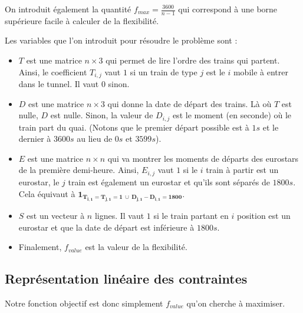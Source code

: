 \documentclass{rapport}
\begin{document}
On introduit également la quantité $f_{max} = \frac{3600}{n - 1}$ qui correspond à une borne supérieure facile à calculer de la flexibilité.

Les variables que l'on introduit pour résoudre le problème sont :
\begin{itemize}
	\item $T$ est une matrice $n \times 3$ qui permet de lire l'ordre des trains qui partent. Ainsi, le coefficient $T_{i,j}$ vaut $1$ si un train de type $j$ est le $i$ mobile à entrer dans le tunnel. Il vaut 0 sinon.
	\item $D$ est une matrice $n \times 3$ qui donne la date de départ des trains. Là où $T$ est nulle, $D$ est nulle. Sinon, la valeur de $D_{i, j}$ est le moment (en seconde) où le train part du quai. (Notons que le premier départ possible est à $1s$ et le dernier à $3600s$ au lieu de $0s$ et $3599s$).
	\item $E$ est une matrice $n \times n$ qui va montrer les moments de départs des eurostars de la première demi-heure. Ainsi, $E_{i, j}$ vaut $1$ si le $i$ train à partir est un eurostar, le $j$ train est également un eurostar et qu'ils sont séparés de $1800s$. Cela équivaut à $\mathbf{1_{T_{i,1} = T_{j,1} = 1\ \cup\ D_{j,1} - D_{i,1} = 1800}}$.
	\item $S$ est un vecteur à $n$ lignes. Il vaut $1$ si le train partant en $i$ position est un eurostar et que la date de départ est inférieure à $1800s$.
	\item Finalement, $f_{value}$ est la valeur de la flexibilité.
\end{itemize}

\subsection{Représentation linéaire des contraintes}

Notre fonction objectif est donc simplement $f_{value}$ qu'on cherche à maximiser.
\end{document}
